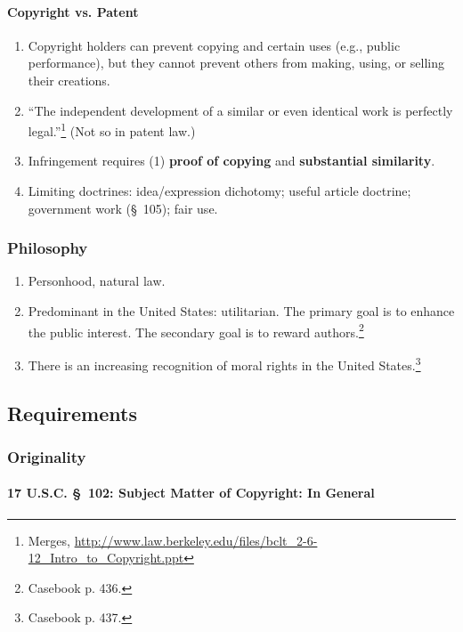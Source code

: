 \paragraph{Copyright vs. Patent}
    
\begin{enumerate}
    \item Copyright holders can prevent copying and certain uses (e.g., public 
    performance), but they cannot prevent others from making, using, or 
    selling their creations.
    \item ``The independent development of a similar or even identical work is 
    perfectly legal.''\footnote{Merges, 
    \url{http://www.law.berkeley.edu/files/bclt_2-6-12_Intro_to_Copyright.ppt}} 
    (Not so in patent law.)
    \item Infringement requires (1) \textbf{proof of copying} and 
    \textbf{substantial similarity}.
    \item Limiting doctrines: idea/expression dichotomy; useful article 
    doctrine; government work (\S\ 105);  fair use.
\end{enumerate}

\subsubsection{Philosophy}

\begin{enumerate}
    \item Personhood, natural law.
    \item Predominant in the United States: utilitarian. The primary goal is 
    to enhance the public interest. The secondary goal is to reward 
    authors.\footnote{Casebook p. 436.}
    \item There is an increasing recognition of moral rights in the United 
    States.\footnote{Casebook p. 437.}
\end{enumerate}

\subsection{Requirements}

\subsubsection{Originality}

\paragraph{17 U.S.C. \S\ 102: Subject Matter of Copyright: In General}

